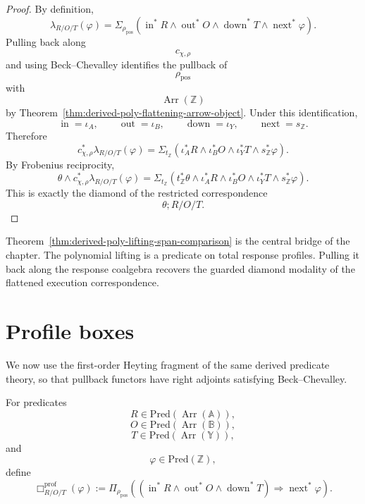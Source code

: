 \begin{proof}
By definition,
\[
\lambda_{R/O/T}(\varphi)
=
\Sigma_{\rho_{\mathrm{pos}}}
\left(
\operatorname{in}^{\ast}R
\wedge
\operatorname{out}^{\ast}O
\wedge
\operatorname{down}^{\ast}T
\wedge
\operatorname{next}^{\ast}\varphi
\right).
\]
Pulling back along
\[
c_{\chi,\rho}
\]
and using Beck--Chevalley identifies the pullback of
\[
\rho_{\mathrm{pos}}
\]
with
\[
\operatorname{Arr}(\mathbb Z)
\]
by Theorem~\ref{thm:derived-poly-flattening-arrow-object}.  Under this
identification,
\[
\operatorname{in}=\iota_A,
\qquad
\operatorname{out}=\iota_B,
\qquad
\operatorname{down}=\iota_Y,
\qquad
\operatorname{next}=s_{\mathbb Z}.
\]
Therefore
\[
c_{\chi,\rho}^{\ast}\lambda_{R/O/T}(\varphi)
=
\Sigma_{t_{\mathbb Z}}
\left(
\iota_A^\ast R
\wedge
\iota_B^\ast O
\wedge
\iota_Y^\ast T
\wedge
s_{\mathbb Z}^{\ast}\varphi
\right).
\]
By Frobenius reciprocity,
\[
\theta
\wedge
c_{\chi,\rho}^{\ast}\lambda_{R/O/T}(\varphi)
=
\Sigma_{t_{\mathbb Z}}
\left(
t_{\mathbb Z}^{\ast}\theta
\wedge
\iota_A^\ast R
\wedge
\iota_B^\ast O
\wedge
\iota_Y^\ast T
\wedge
s_{\mathbb Z}^{\ast}\varphi
\right).
\]
This is exactly the diamond of the restricted correspondence
\[
\theta;R/O/T.
\]
\end{proof}

\begin{remark}
\label{rem:derived-poly-central-comparison}
Theorem~\ref{thm:derived-poly-lifting-span-comparison} is the central bridge
of the chapter.  The polynomial lifting is a predicate on total response
profiles.  Pulling it back along the response coalgebra recovers the guarded
diamond modality of the flattened execution correspondence.
\end{remark}

\section{Profile boxes}
\label{sec:derived-poly-profile-boxes}

We now use the first-order Heyting fragment of the same derived predicate
theory, so that pullback functors have right adjoints satisfying
Beck--Chevalley.

\begin{definition}
\label{def:derived-poly-weak-profile-box}
For predicates
\[
R\in\mathrm{Pred}(\operatorname{Arr}(\mathbb A)),
\]
\[
O\in\mathrm{Pred}(\operatorname{Arr}(\mathbb B)),
\]
\[
T\in\mathrm{Pred}(\operatorname{Arr}(\mathbb Y)),
\]
and
\[
\varphi\in\mathrm{Pred}(\mathbb Z),
\]
define
\[
\Box^{\mathrm{prof}}_{R/O/T}(\varphi)
:=
\Pi_{\rho_{\mathrm{pos}}}
\left(
(
\operatorname{in}^{\ast}R
\wedge
\operatorname{out}^{\ast}O
\wedge
\operatorname{down}^{\ast}T
)
\Rightarrow
\operatorname{next}^{\ast}\varphi
\right).
\]
\end{definition}

